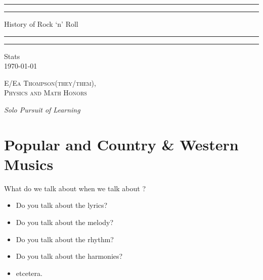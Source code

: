 \documentclass[12pt, a4paper, twoside, openright, titlepage]{book}
\begin{document}

\begin{titlepage}
    \centering
    \scshape
    \vspace*{\baselineskip}
    \rule{\textwidth}{1.6pt}\vspace*{-\baselineskip}\vspace*{2pt}
    \rule{\textwidth}{0.4pt}
    
    \vspace{0.75\baselineskip}
    
    {\LARGE History of Rock `n' Roll}
    
    \vspace{0.75\baselineskip}
    
    \rule{\textwidth}{0.4pt}\vspace*{-\baselineskip}\vspace{3.2pt}
    \rule{\textwidth}{1.6pt}
    
    \vspace{2\baselineskip}
    Stats \\
    \vspace*{3\baselineskip}
    \monthdayyeardate\today \\
    \vspace*{5.0\baselineskip}
    
    {\scshape\Large E/Ea Thompson(they/them), \\ Physics and Math Honors\\}
    
    \vspace{1.0\baselineskip}
    \textit{Solo Pursuit of Learning}
\end{titlepage}

\tableofcontents


\chapter{Popular and Country \& Western Musics}

\begin{qst}{}{}
    What do we talk about when we talk about ?
\end{qst}
\begin{itemize}
    \item Do you talk about the lyrics?
    \item Do you talk about the melody?
    \item Do you talk about the rhythm?
    \item Do you talk about the harmonies?
    \item etcetera.
\end{itemize}
\end{document}
